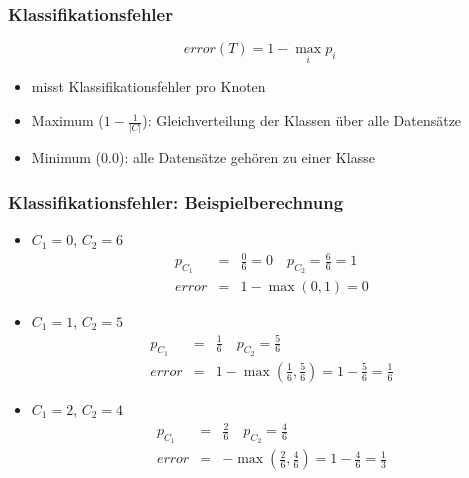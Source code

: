 
\begin{frame}
\frametitle{Klassifikationsfehler}

$$
\textit{error}(T) = 1 - \underset{i}{\max} p_i
$$
\begin{itemize}
\item misst Klassifikationsfehler pro Knoten
\item Maximum ($1 - \frac{1}{|C|}$): Gleichverteilung der Klassen über
  alle Datensätze
\item Minimum ($0.0$): alle Datensätze gehören zu einer Klasse

\end{itemize}

\end{frame}


\begin{frame}
\frametitle{Klassifikationsfehler: Beispielberechnung}

\begin{itemize}
\item $C_1 = 0$, $C_2 = 6$
\begin{eqnarray*}
p_{C_1}&=&\frac{0}{6} = 0 \quad p_{C_2}=\frac{6}{6}=1\\
\textit{error}&=&1 - \max (0,1) = 0
\end{eqnarray*}
\item $C_1 = 1$, $C_2 = 5$
\begin{eqnarray*}
p_{C_1}&=&\frac{1}{6} \quad p_{C_2}=\frac{5}{6}\\
\textit{error}&=&1 - \max(\frac{1}{6}, \frac{5}{6}) = 1 - \frac{5}{6} =
\frac{1}{6}
\end{eqnarray*}
\item $C_1 = 2$, $C_2 = 4$
\begin{eqnarray*}
p_{C_1}&=&\frac{2}{6} \quad p_{C_2}=\frac{4}{6}\\
\textit{error}&=& - \max(\frac{2}{6}, \frac{4}{6}) = 1 - \frac{4}{6} =
\frac{1}{3}
\end{eqnarray*}
\end{itemize}
\end{frame}



